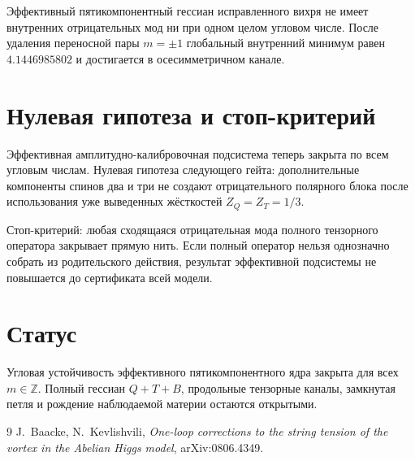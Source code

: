 \begin{theorem}
Эффективный пятикомпонентный гессиан исправленного вихря не имеет внутренних
отрицательных мод ни при одном целом угловом числе. После удаления переносной
пары $m=\pm1$ глобальный внутренний минимум равен
$4.1446985802$ и достигается в осесимметричном канале.
\end{theorem}

\section{Нулевая гипотеза и стоп-критерий}

Эффективная амплитудно-калибровочная подсистема теперь закрыта по всем угловым
числам. Нулевая гипотеза следующего гейта: дополнительные компоненты спинов
два и три не создают отрицательного полярного блока после использования уже
выведенных жёсткостей $Z_Q=Z_T=1/3$.

Стоп-критерий: любая сходящаяся отрицательная мода полного тензорного оператора
закрывает прямую нить. Если полный оператор нельзя однозначно собрать из
родительского действия, результат эффективной подсистемы не повышается до
сертификата всей модели.

\section{Статус}

Угловая устойчивость эффективного пятикомпонентного ядра закрыта для всех
$m\in\mathbb Z$. Полный гессиан $Q+T+B$, продольные тензорные каналы,
замкнутая петля и рождение наблюдаемой материи остаются открытыми.

\begin{thebibliography}{9}
J.~Baacke, N.~Kevlishvili,
\emph{One-loop corrections to the string tension of the vortex in the
Abelian Higgs model}, arXiv:0806.4349.
\end{thebibliography}